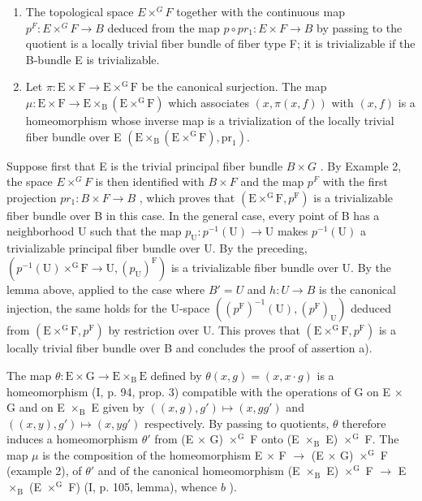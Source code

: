 \begin{enumerate}
\def\labelenumi{\alph{enumi})}
\item
  The topological space \(E \times^{G} F\) together with the continuous map \(p^{F}: E \times^{G} F \to B\) deduced from the map \(p \circ pr_{1}: E \times F \to B\) by passing to the quotient is a locally trivial fiber bundle of fiber type F; it is trivializable if the B-bundle E is trivializable.
\item
  Let \(\pi\colon\mathrm{E}\times\mathrm{F}\to\mathrm{E}\times^{\mathrm{G}}\mathrm{F}\) be the canonical surjection. The map \(\mu\colon\mathrm{E}\times\mathrm{F}\to\mathrm{E}\times_{\mathrm{B}}(\mathrm{E}\times^{\mathrm{G}}\mathrm{F})\) which associates \((x,\pi(x,f))\) with \((x,f)\) is a homeomorphism whose inverse map is a trivialization of the locally trivial fiber bundle over E \((\mathrm{E}\times_{\mathrm{B}}(\mathrm{E}\times^{\mathrm{G}}\mathrm{F}),\mathrm{pr}_{1})\).
\end{enumerate}

Suppose first that E is the trivial principal fiber bundle \(B \times G\) . By Example 2, the space \(E \times^{G} F\) is then identified with \(B \times F\) and the map \(p^{F}\) with the first projection \(pr_{1}: B \times F \to B\) , which proves that \((\mathrm{E} \times^{\mathrm{G}}\mathrm{F}, p^{\mathrm{F}})\) is a trivializable fiber bundle over B in this case. In the general case, every point of B has a neighborhood U such that the map \(p_{\mathrm{U}}: p^{-1}(\mathrm{U}) \to \mathrm{U}\) makes \(p^{-1}(\mathrm{U})\) a trivializable principal fiber bundle over U. By the preceding, \((p^{-1}(\mathrm{U}) \times^{\mathrm{G}}\mathrm{F} \to \mathrm{U}, (p_{\mathrm{U}})^{\mathrm{F}})\) is a trivializable fiber bundle over U. By the lemma above, applied to the case where \(B' = U\) and \(h: U \to B\) is the canonical injection, the same holds for the U-space \(((p^{\mathrm{F}})^{-1}(\mathrm{U}), (p^{\mathrm{F}})_{\mathrm{U}})\) deduced from \((\mathrm{E} \times^{\mathrm{G}}\mathrm{F}, p^{\mathrm{F}})\) by restriction over U. This proves that \((\mathrm{E} \times^{\mathrm{G}}\mathrm{F}, p^{\mathrm{F}})\) is a locally trivial fiber bundle over B and concludes the proof of assertion a).

The map \(\theta\colon\mathrm{E}\times\mathrm{G}\to\mathrm{E}\times_{\mathrm{B}}\mathrm{E}\) defined by \(\theta(x,g)=(x,x\cdot g)\) is a homeomorphism (I, p. 94, prop. 3) compatible with the operations of G on E \(\times\) G and on E \(\times_{\mathrm{B}}\) E given by \(((x,g),g')\mapsto(x,gg')\) and \(((x,y),g')\mapsto(x,yg')\) respectively. By passing to quotients, \(\theta\) therefore induces a homeomorphism \(\theta'\) from (E \(\times\) G) \(\times^{\mathrm{G}}\) F onto (E \(\times_{\mathrm{B}}\) E) \(\times^{\mathrm{G}}\) F. The map \(\mu\) is the composition of the homeomorphism E \(\times\) F \(\rightarrow\) (E \(\times\) G) \(\times^{\mathrm{G}}\) F (example 2), of \(\theta'\) and of the canonical homeomorphism (E \(\times_{\mathrm{B}}\) E) \(\times^{\mathrm{G}}\) F \(\rightarrow\) E \(\times_{\mathrm{B}}\) (E \(\times^{\mathrm{G}}\) F) (I, p. 105, lemma), whence \(b\) ).

